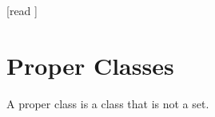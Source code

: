 \documentclass[10pt]{article}
\begin{document}
  \begin{imports}
    \begin{forthel}
      [read ]
    \end{forthel}
  \end{imports}


  \section*{Proper Classes}

  \begin{forthel}
    \begin{definition}[id=FOUNDATIONS_10_8452102365965847,printid]
      A proper class is a class that is not a set.
    \end{definition}
  \end{forthel}
\end{document}
